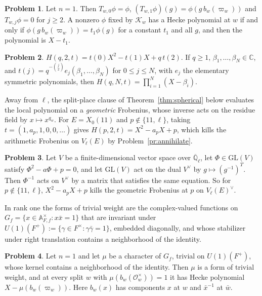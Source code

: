 \documentclass[reqno]{amsart}
\theoremstyle{definition}
\newtheorem{problem}{Problem}[section]
\theoremstyle{plain}
\newcommand{\Q}{\mathbb{Q}}
\newcommand{\C}{\mathbb{C}}
\newcommand{\A}{\mathbb{A}}
\newcommand{\Qlb}{\overline{\Q}_\ell}
\newcommand{\Oc}{\mathcal{O}}
\newcommand{\Kc}{\mathcal{K}}
\newcommand{\GL}{\mathrm{GL}}
\begin{document}
\begin{problem}\label{pr:rank-one}
Let \(n = 1\).  Then \(T_{w,0}\phi = \phi\), \((T_{w,1}\phi)(g) = \phi(g\, b_w(\varpi_w))\) and \(T_{w,j}\phi = 0\) for \(j \ge 2\).  A nonzero \(\phi\) fixed by \(\Kc_w\) has a Hecke polynomial at \(w\) if and only if \(\phi(g\,b_w(\varpi_w)) = t_1\phi(g)\) for a constant \(t_1\) and all \(g\), and then the polynomial is \(X - t_1\).
\end{problem}

\begin{problem}\label{pr:heckepoly}
\(H(q, 2, t) = t(0)X^2 - t(1)X + q\,t(2)\).  If \(q \ge 1\), \(\beta_1, \dots, \beta_N \in \C\), and \(t(j) = q^{-\binom{j}{2}} e_j(\beta_1, \dots, \beta_N)\) for \(0 \le j \le N\), with \(e_j\) the elementary symmetric polynomials, then \(H(q, N, t) = \prod_{i=1}^{N} (X - \beta_i)\).
\end{problem}

Away from \(\ell\), the split-place clause of Theorem~\ref{thm:spherical} below evaluates the local polynomial on a \emph{geometric} Frobenius, whose inverse acts on the residue field by \(x \mapsto x^{q_w}\).  For \(E = X_0(11)\) and \(p \notin \{11, \ell\}\), taking \(t = (1, a_p, 1, 0, 0, \dots)\) gives \(H(p, 2, t) = X^2 - a_pX + p\), which kills the arithmetic Frobenius on \(V_\ell(E)\) by Problem~\ref{pr:annihilate}.

\begin{problem}\label{pr:geometric}
Let \(V\) be a finite-dimensional vector space over \(\Qlb\), let \(\Phi \in \GL(V)\) satisfy \(\Phi^2 - a\Phi + p = 0\), and let \(\GL(V)\) act on the dual \(V^\vee\) by \(g \mapsto (g^{-1})^T\).  Then \(\Phi^{-1}\) acts on \(V^\vee\) by a matrix that satisfies the same equation.  So for \(p \notin \{11, \ell\}\), \(X^2 - a_pX + p\) kills the geometric Frobenius at \(p\) on \(V_\ell(E)^\vee\).
\end{problem}

In rank one the forms of trivial weight are the complex-valued functions on \(G_f = \{x \in \A_{F,f}^\times : x\bar x = 1\}\) that are invariant under \(U(1)(F^+) := \{\gamma \in F^\times : \gamma\bar\gamma = 1\}\), embedded diagonally, and whose stabilizer under right translation contains a neighborhood of the identity.

\begin{problem}\label{pr:U1-forms}
Let \(n = 1\) and let \(\mu\) be a character of \(G_f\), trivial on \(U(1)(F^+)\), whose kernel contains a neighborhood of the identity.  Then \(\mu\) is a form of trivial weight, and at every split \(w\) with \(\mu(b_w(\Oc_w^\times)) = 1\) it has Hecke polynomial \(X - \mu(b_w(\varpi_w))\).  Here \(b_w(x)\) has components \(x\) at \(w\) and \(\bar x^{-1}\) at \(\bar w\).
\end{problem}
\end{document}
